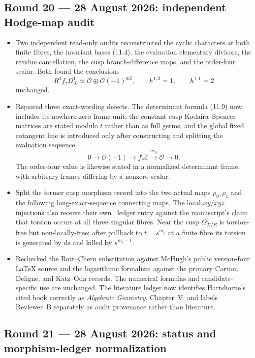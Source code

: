 \subsection*{Round 20 --- 28 August 2026: independent Hodge-map audit}

\begin{itemize}[leftmargin=1.8em]
\item Two independent read-only audits reconstructed the cyclic characters
at both finite fibres, the invariant bases (11.4), the evaluation elementary
divisors, the residue cancellation, the cusp branch-difference maps, and the
order-four scalar.  Both found the conclusions
\[
 R^1f_*\Omega_X^1\simeq\mathcal O\oplus\mathcal O(-1)^{\oplus2},
 \qquad h^{1,2}=1,\qquad h^{1,1}=2
\]
unchanged.
\item Repaired three exact-wording defects.  The determinant formula (11.9)
now includes its nowhere-zero frame unit; the constant cusp
Kodaira--Spencer matrices are stated modulo $t$ rather than as full germs;
and the global fixed cotangent line is introduced only after constructing
and splitting the evaluation sequence
\[
 0\to\mathcal O(-1)\to f_*\mathcal E
 \xrightarrow{\operatorname{ev}_\xi}\mathcal O\to0.
\]
The order-four value is likewise stated in a normalized determinant frame,
with arbitrary frames differing by a nonzero scalar.
\item Split the former cusp morphism record into the two actual maps
$\rho_0,\rho_1$ and the following long-exact-sequence connecting maps.
The local $xy/xyz$ injections also receive their own \Refuted\ ledger
entry against the manuscript's claim that torsion occurs at all three
singular fibres.  Near the cusp $\Omega^1_{X/B}$ is torsion-free but
non-locally-free; after pullback to $t=s^{m_j}$ at a finite fibre its torsion
is generated by $ds$ and killed by $s^{m_j-1}$.
\item Rechecked the Bott--Chern substitution against McHugh's public
version-four LaTeX source and the logarithmic formalism against the primary
Cartan, Deligne, and Katz--Oda records.  The numerical formulas and
candidate-specific use are unchanged.  The literature ledger now identifies
Hartshorne's cited book correctly as \emph{Algebraic Geometry}, Chapter~V,
and labels Reviewer~B separately as audit provenance rather than literature.
\end{itemize}

\subsection*{Round 21 --- 28 August 2026: status and morphism-ledger normalization}

